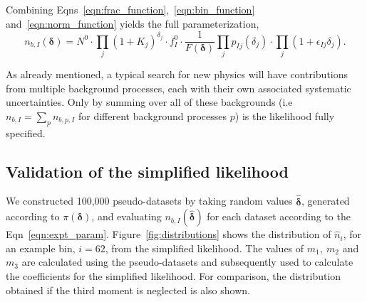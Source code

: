 \documentclass[11pt]{article}
\begin{document}
Combining Eqns~\ref{eqn:frac_function},~\ref{eqn:bin_function} and~\ref{eqn:norm_function} yields the full parameterization,
%
\begin{equation}
 n_{b,I}(\bm{\delta}) = N^{0}\cdot \prod_{j}(1+K_{j})^{\delta_{j}} \cdot f^{0}_{I} \cdot\frac{1}{F(\bm{\delta})} \prod_{j} p_{Ij}(\delta_{j}) \cdot \prod_{j} (1+\epsilon_{Ij}\delta_{j}).
\label{eqn:expt_param}
\end{equation}

As already mentioned, a typical search for new physics will have contributions from multiple background processes, each with their own associated systematic uncertainties.
Only by summing over all of these backgrounds (i.e $n_{b,I}=\sum_{p}n_{b,p,I}$ for different background processes $p$) is the likelihood fully specified.









\subsection{Validation of the simplified likelihood}


We constructed 100,000 pseudo-datasets by taking random values ${\hat{\bm{\delta}}}$, generated according to $\pi(\bm{\delta})$, and evaluating
$n_{b,I}(\hat{\bm{\delta}})$ for each dataset according to the Eqn~\ref{eqn:expt_param}. Figure~\ref{fig:distributions} shows the distribution of $\hat{n}_{i}$, for an example bin, $i=62$,
from the simplified likelihood. The values of $m_{1},~m_{2}$ and $m_{3}$ are calculated using the pseudo-datasets and subsequently used to calculate the coefficients for the simplified likelihood.
For comparison, the distribution obtained if the third moment is neglected is also shown.
\end{document}
